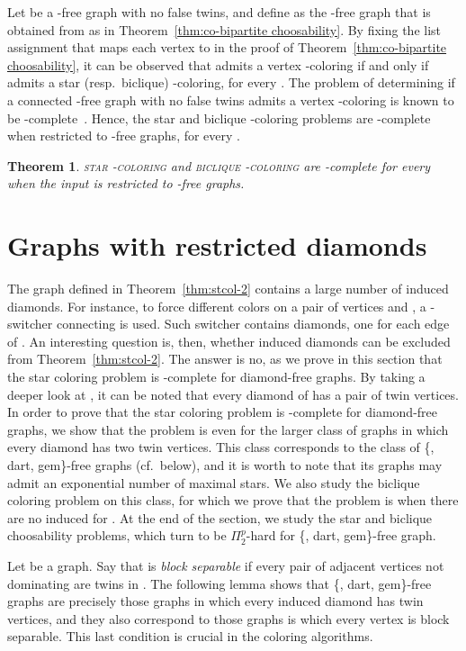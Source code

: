 \documentclass[a4paper, 11pt, oneside]{article}
\newtheorem{theorem}{Theorem}
\newcommand{\bccol}[1]{\textsc{biclique -coloring}}
\newcommand{\stcol}[1]{\textsc{star -coloring}}
\newcommand{\ptwop}{\ensuremath{\Pi^p_2}\xspace}
\let\Definition=\emph
\begin{document}
Let  be a -free graph with no false twins, and define  as the -free graph that is obtained from  as in Theorem~\ref{thm:co-bipartite choosability}.  By fixing the list assignment that maps each vertex to  in the proof of Theorem~\ref{thm:co-bipartite choosability}, it can be observed that  admits a vertex -coloring if and only if  admits a star (resp.\ biclique) -coloring, for every .  The problem of determining if a connected -free graph with no false twins admits a vertex -coloring is known to be \NP-complete~\cite{Lovasz1973,MaffrayPreissmannDM1996}.  Hence, the star and biclique -coloring problems are -complete when restricted to -free graphs, for every .
 

\begin{theorem}\label{thm:co-k3 coloring}
 \stcol{k} and \bccol{k} are \NP-complete for every  when the input is restricted to -free graphs.
\end{theorem}


\section{Graphs with restricted diamonds}
\label{sec:diamond-free}

The graph  defined in Theorem~\ref{thm:stcol-2} contains a large number of induced diamonds.  For instance, to force different colors on a pair of vertices  and , a -switcher  connecting  is used.  Such switcher contains  diamonds, one for each edge of .  An interesting question is, then, whether induced diamonds can be excluded from Theorem~\ref{thm:stcol-2}.  The answer is no, as we prove in this section that the star coloring problem is \NP-complete for diamond-free graphs.  By taking a deeper look at , it can be noted that every diamond of  has a pair of twin vertices.  In order to prove that the star coloring problem is \NP-complete for diamond-free graphs, we show that the problem is \NP even for the larger class of graphs in which every diamond has two twin vertices.  This class corresponds to the class of \{, dart, gem\}-free graphs (cf.\ below), and it is worth to note that its graphs may admit an exponential number of maximal stars.  We also study the biclique coloring problem on this class, for which we prove that the problem is \NP when there are no induced  for .  At the end of the section, we study the star and biclique choosability problems, which turn to be \ptwop-hard for \{, dart, gem\}-free graph.

Let  be a graph.  Say that  is \Definition{block separable} if every pair of adjacent vertices  not dominating  are twins in .  The following lemma shows that \{, dart, gem\}-free graphs are precisely those graphs in which every induced diamond has twin vertices, and they also correspond to those graphs is which every vertex is block separable.  This last condition is crucial in the \NP coloring algorithms.
\end{document}
